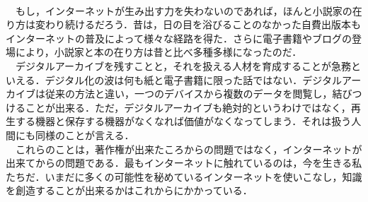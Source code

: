 \documentclass[uplatex,twocolumn,dvipdfmx]{jsarticle}
\begin{document}
\\　もし，インターネットが生み出す力を失わないのであれば，ほんと小説家の在り方は変わり続けるだろう．昔は，日の目を浴びることのなかった自費出版本もインターネットの普及によって様々な経路を得た．さらに電子書籍やブログの登場により，小説家と本の在り方は昔と比べ多種多様になったのだ． 
\\　デジタルアーカイブを残すことと，それを扱える人材を育成することが急務といえる．デジタル化の波は何も紙と電子書籍に限った話ではない．デジタルアーカイブは従来の方法と違い，一つのデバイスから複数のデータを閲覧し，結びつけることが出来る．ただ，デジタルアーカイブも絶対的というわけではなく，再生する機器と保存する機器がなくなれば価値がなくなってしまう．それは扱う人間にも同様のことが言える． 
\\　これらのことは，著作権が出来たころからの問題ではなく，インターネットが出来てからの問題である．最もインターネットに触れているのは，今を生きる私たちだ．いまだに多くの可能性を秘めているインターネットを使いこなし，知識を創造することが出来るかはこれからにかかっている\cite{BB17693944}．




\end{document}
